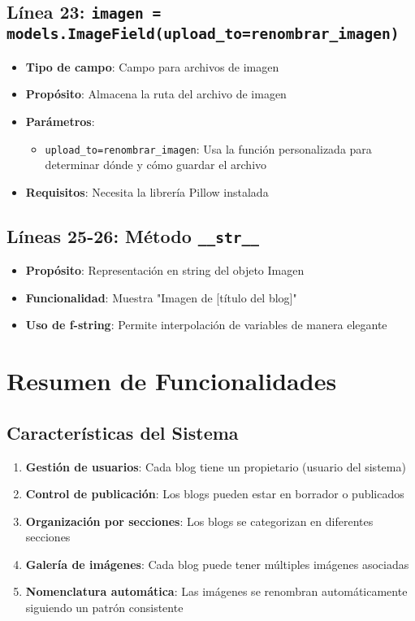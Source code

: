 \documentclass[12pt,a4paper]{article}
\begin{document}
	\subsection{Línea 23: \texttt{imagen = models.ImageField(upload\_to=renombrar\_imagen)}}
	\begin{itemize}
		\item \textbf{Tipo de campo}: Campo para archivos de imagen
		\item \textbf{Propósito}: Almacena la ruta del archivo de imagen
		\item \textbf{Parámetros}:
		\begin{itemize}
			\item \texttt{upload\_to=renombrar\_imagen}: Usa la función personalizada para determinar dónde y cómo guardar el archivo
		\end{itemize}
		\item \textbf{Requisitos}: Necesita la librería Pillow instalada
	\end{itemize}
	
	\subsection{Líneas 25-26: Método \texttt{\_\_str\_\_}}
	\begin{itemize}
		\item \textbf{Propósito}: Representación en string del objeto Imagen
		\item \textbf{Funcionalidad}: Muestra "Imagen de [título del blog]"
		\item \textbf{Uso de f-string}: Permite interpolación de variables de manera elegante
	\end{itemize}
	
	\section{Resumen de Funcionalidades}
	
	\subsection{Características del Sistema}
	\begin{enumerate}
		\item \textbf{Gestión de usuarios}: Cada blog tiene un propietario (usuario del sistema)
		\item \textbf{Control de publicación}: Los blogs pueden estar en borrador o publicados
		\item \textbf{Organización por secciones}: Los blogs se categorizan en diferentes secciones
		\item \textbf{Galería de imágenes}: Cada blog puede tener múltiples imágenes asociadas
		\item \textbf{Nomenclatura automática}: Las imágenes se renombran automáticamente siguiendo un patrón consistente
	\end{enumerate}
	
\end{document}

